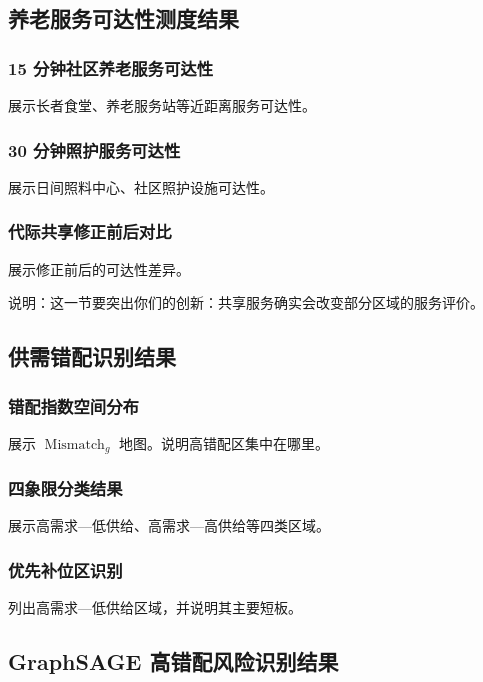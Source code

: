 \subsection{养老服务可达性测度结果}

\subsubsection{15 分钟社区养老服务可达性}

展示长者食堂、养老服务站等近距离服务可达性。

\subsubsection{30 分钟照护服务可达性}

展示日间照料中心、社区照护设施可达性。

\subsubsection{代际共享修正前后对比}

展示修正前后的可达性差异。

说明：这一节要突出你们的创新：共享服务确实会改变部分区域的服务评价。

\subsection{供需错配识别结果}

\subsubsection{错配指数空间分布}

展示 $\operatorname{Mismatch}_g$ 地图。说明高错配区集中在哪里。

\subsubsection{四象限分类结果}

展示高需求—低供给、高需求—高供给等四类区域。

\subsubsection{优先补位区识别}

列出高需求—低供给区域，并说明其主要短板。

\subsection{GraphSAGE 高错配风险识别结果}

